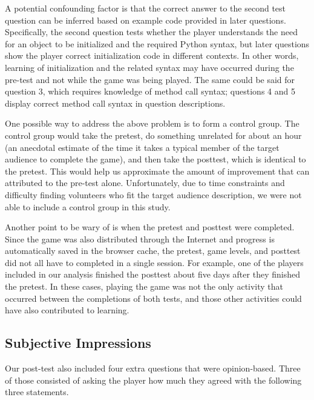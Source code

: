\documentclass[12pt,notitlepage]{article}
\begin{document}
A potential confounding factor is that the correct answer to the second
test question can be inferred based on example code provided in later
questions. Specifically, the second question tests whether the player
understands the need for an object to be initialized and the required Python
syntax, but later questions show the player correct initialization code in
different contexts. In other words, learning of initialization and the related
syntax may have occurred during the pre-test and not while the game was being
played. The same could be said for question 3, which requires knowledge of
method call syntax; questions 4 and 5 display correct method call syntax in
question descriptions.

One possible way to address the above problem is to form a control group.
The control group would take the pretest, do something unrelated for about
an hour (an anecdotal estimate of the time it takes a typical member of the
target audience to complete the game), and then take the posttest, which is
identical to the pretest. This would help us approximate the amount of
improvement that can attributed to the pre-test alone. Unfortunately, due to
time constraints and difficulty finding volunteers who fit the target audience
description, we were not able to include a control group in this study.

Another point to be wary of is when the pretest and posttest were completed.
Since the game was also distributed through the Internet and progress is
automatically saved in the browser cache, the pretest, game levels, and
posttest did not all have to completed in a single session. For example, one of
the players included in our analysis finished the posttest about five days
after they finished the pretest. In these cases, playing the game was not the
only activity that occurred between the completions of both tests, and those
other activities could have also contributed to learning.


\subsection{Subjective Impressions}

Our post-test also included four extra questions that were opinion-based.
Three of those consisted of asking the player how much they agreed with
the following three statements.
\end{document}
